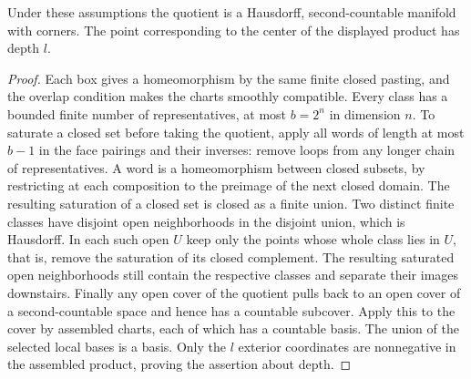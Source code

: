 \begin{proposition}\label{f:sector-theorem}
Under these assumptions the quotient is a Hausdorff, second-countable manifold with corners. The point corresponding to the center of the displayed product has depth $l$.
\end{proposition}
\begin{proof}
Each box gives a homeomorphism by the same finite closed pasting, and the overlap condition makes the charts smoothly compatible. Every class has a bounded finite number of representatives, at most $b=2^n$ in dimension $n$. To saturate a closed set before taking the quotient, apply all words of length at most $b-1$ in the face pairings and their inverses: remove loops from any longer chain of representatives. A word is a homeomorphism between closed subsets, by restricting at each composition to the preimage of the next closed domain. The resulting saturation of a closed set is closed as a finite union. Two distinct finite classes have disjoint open neighborhoods in the disjoint union, which is Hausdorff. In each such open $U$ keep only the points whose whole class lies in $U$, that is, remove the saturation of its closed complement. The resulting saturated open neighborhoods still contain the respective classes and separate their images downstairs. Finally any open cover of the quotient pulls back to an open cover of a second-countable space and hence has a countable subcover. Apply this to the cover by assembled charts, each of which has a countable basis. The union of the selected local bases is a basis. Only the $l$ exterior coordinates are nonnegative in the assembled product, proving the assertion about depth.
\end{proof}

